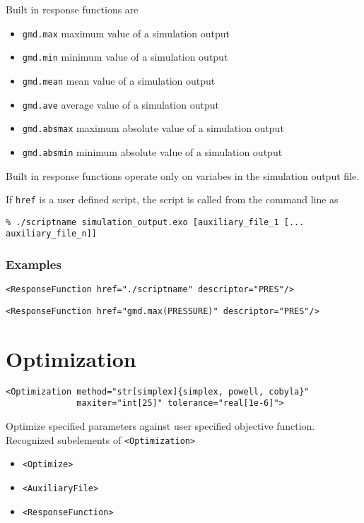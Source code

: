 \documentclass[11pt]{report}
\renewcommand{\tag}[1]{\texttt{<#1>}}
\begin{document}
Built in response functions are
%
\begin{itemize}
  \item \texttt{gmd.max} maximum value of a simulation output
  \item \texttt{gmd.min} minimum value of a simulation output
  \item \texttt{gmd.mean} mean value of a simulation output
  \item \texttt{gmd.ave} average value of a simulation output
  \item \texttt{gmd.absmax} maximum absolute value of a simulation output
  \item \texttt{gmd.absmin} minimum absolute value of a simulation output
\end{itemize}
%
Built in response functions operate only on variabes in the simulation output file.

If \texttt{href} is a user defined script, the script is called from the
command line as
\begin{verbatim}
% ./scriptname simulation_output.exo [auxiliary_file_1 [... auxiliary_file_n]]
\end{verbatim}

\subsubsection{Examples}
\begin{verbatim}
<ResponseFunction href="./scriptname" descriptor="PRES"/>
\end{verbatim}


\begin{verbatim}
<ResponseFunction href="gmd.max(PRESSURE)" descriptor="PRES"/>
\end{verbatim}

\section{Optimization}
\begin{verbatim}
<Optimization method="str[simplex]{simplex, powell, cobyla}"
              maxiter="int[25]" tolerance="real[1e-6]">
\end{verbatim}
%
Optimize specified parameters against user specified objective function.
Recognized subelements of \tag{Optimization}

\begin{itemize}
  \item \tag{Optimize}
  \item \tag{AuxiliaryFile}
  \item \tag{ResponseFunction}
\end{itemize}
\end{document}
